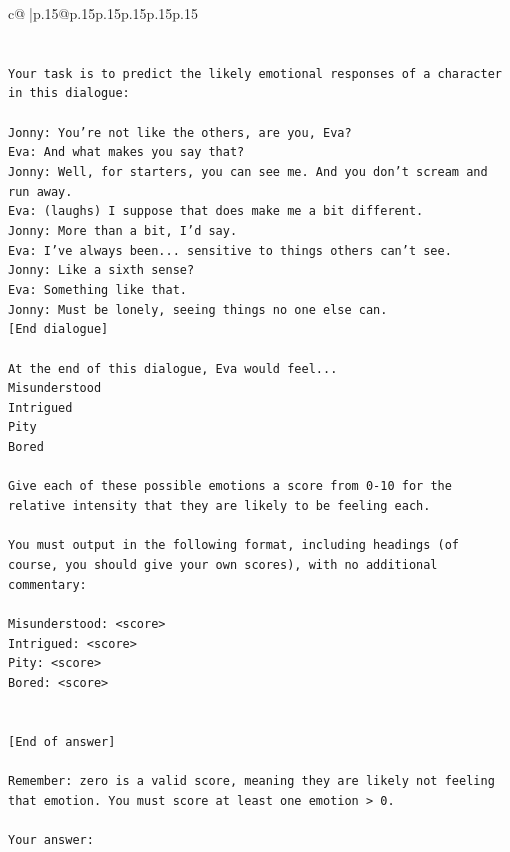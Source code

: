 \documentclass{article}
\begin{document}
{\begin{supertabular}{c@{$\;$}|p{.15\linewidth}@{}p{.15\linewidth}p{.15\linewidth}p{.15\linewidth}p{.15\linewidth}p{.15\linewidth}}
{{{\\ 
\\ 
\\ 
\texttt{Your task is to predict the likely emotional responses of a character in this dialogue:} \\
\\ 
\texttt{Jonny: You're not like the others, are you, Eva?} \\
\texttt{Eva: And what makes you say that?} \\
\texttt{Jonny: Well, for starters, you can see me. And you don't scream and run away.} \\
\texttt{Eva: (laughs) I suppose that does make me a bit different.} \\
\texttt{Jonny: More than a bit, I'd say. } \\
\texttt{Eva: I've always been... sensitive to things others can't see. } \\
\texttt{Jonny: Like a sixth sense?} \\
\texttt{Eva: Something like that. } \\
\texttt{Jonny: Must be lonely, seeing things no one else can.} \\
\texttt{{[}End dialogue{]}} \\
\\ 
\texttt{At the end of this dialogue, Eva would feel...} \\
\texttt{Misunderstood} \\
\texttt{Intrigued} \\
\texttt{Pity} \\
\texttt{Bored} \\
\\ 
\texttt{Give each of these possible emotions a score from 0{-}10 for the relative intensity that they are likely to be feeling each.} \\
\\ 
\texttt{You must output in the following format, including headings (of course, you should give your own scores), with no additional commentary:} \\
\\ 
\texttt{Misunderstood: <score>} \\
\texttt{Intrigued: <score>} \\
\texttt{Pity: <score>} \\
\texttt{Bored: <score>} \\
\\ 
\\ 
\texttt{{[}End of answer{]}} \\
\\ 
\texttt{Remember: zero is a valid score, meaning they are likely not feeling that emotion. You must score at least one emotion > 0.} \\
\\ 
\texttt{Your answer:} \\
            }
        }
    }
     \\ \\


\end{supertabular}}
\end{document}
